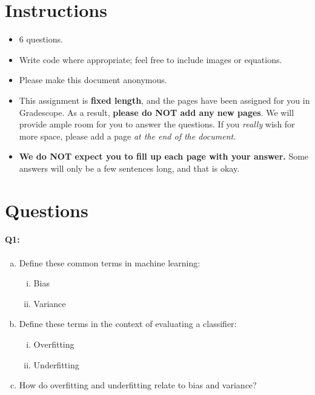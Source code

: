 \maketitle
\thispagestyle{fancy}
\vspace{-3cm}

\section*{Instructions}
\begin{itemize}
  \item 6 questions.
  \item Write code where appropriate; feel free to include images or equations.
  \item Please make this document anonymous.
  \item This assignment is \textbf{fixed length}, and the pages have been assigned for you in Gradescope. As a result, \textbf{please do NOT add any new pages}. We will provide ample room for you to answer the questions. If you \emph{really} wish for more space, please add a page \emph{at the end of the document}.
  \item \textbf{We do NOT expect you to fill up each page with your answer.} Some answers will only be a few sentences long, and that is okay.
\end{itemize}

\section*{Questions}


\paragraph{Q1:} 

\begin{enumerate} [(a)]
    \item Define these common terms in machine learning:
    \begin{enumerate} [(i)]
    \item Bias
    \item Variance
    \end{enumerate}
    \item Define these terms in the context of evaluating a classifier:
    \begin{enumerate} [(i)]
    \item Overfitting
    \item Underfitting
    \end{enumerate}
    \item How do overfitting and underfitting relate to bias and variance?
\end{enumerate}

